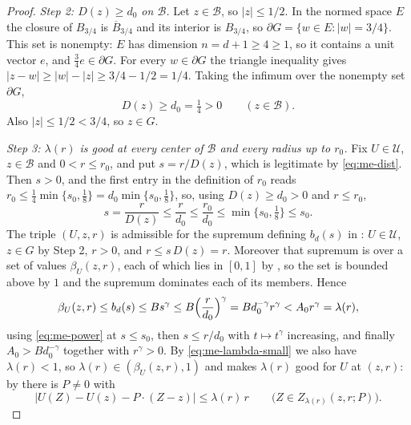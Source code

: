 \begin{proof}
\emph{Step 2: $D(z)\ge d_0$ on $\mathcal B$.}
Let $z\in\mathcal B$, so $|z|\le1/2$. In the normed space $E$ the closure of
$B_{3/4}$ is $\overline B_{3/4}$ and its interior is $B_{3/4}$, so
$\partial G=\{w\in E:|w|=3/4\}$. This set is nonempty: $E$ has dimension
$n=d+1\ge4\ge1$, so it contains a unit vector $e$, and $\tfrac34e\in\partial G$.
For every $w\in\partial G$ the triangle inequality gives
$|z-w|\ge|w|-|z|\ge3/4-1/2=1/4$. Taking the infimum over the nonempty set
$\partial G$,
\begin{equation}\label{eq:me-dist}
  D(z)\ge d_0=\tfrac14>0\qquad(z\in\mathcal B).
\end{equation}
Also $|z|\le1/2<3/4$, so $z\in G$.

\emph{Step 3: $\lambda(r)$ is good at every center of $\mathcal B$ and every
radius up to $r_0$.}
Fix $U\in\mathcal U$, $z\in\mathcal B$ and $0<r\le r_0$, and put
$s=r/D(z)$, which is legitimate by \eqref{eq:me-dist}. Then $s>0$, and the first entry in the definition of $r_0$ reads
$r_0\le\tfrac14\min\{s_0,\tfrac18\}=d_0\min\{s_0,\tfrac18\}$, so, using
$D(z)\ge d_0>0$ and $r\le r_0$,
\[
  s=\frac{r}{D(z)}\le\frac{r}{d_0}\le\frac{r_0}{d_0}
   \le\min\{s_0,\tfrac18\}\le s_0 .
\]
The triple $(U,z,r)$ is admissible for the
supremum defining $b_d(s)$ in : $U\in\mathcal U$,
$z\in G$ by Step 2, $r>0$, and $r\le s\,D(z)=r$. Moreover that supremum is over
a set of values $\beta_U(z,r)$, each of which lies in $[0,1]$ by
, so the set is bounded above by $1$ and the supremum
dominates each of its members. Hence
\[
  \beta_U(z,r)\le b_d(s)\le Bs^\gamma\le B\Bigl(\frac{r}{d_0}\Bigr)^\gamma
   =Bd_0^{-\gamma}r^\gamma<A_0r^\gamma=\lambda(r),
\]
using \eqref{eq:me-power} at $s\le s_0$, then $s\le r/d_0$ with
$t\mapsto t^\gamma$ increasing, and finally $A_0>Bd_0^{-\gamma}$ together with
$r^\gamma>0$. By \eqref{eq:me-lambda-small} we also have $\lambda(r)<1$, so
$\lambda(r)\in(\beta_U(z,r),1)$ and  makes $\lambda(r)$
good for $U$ at $(z,r)$: by  there is $P\ne0$ with
\begin{equation}\label{eq:me-fit}
  |U(Z)-U(z)-P\cdot(Z-z)|\le\lambda(r)\,r
  \qquad\bigl(Z\in Z_{\lambda(r)}(z,r;P)\bigr).
\end{equation}


\end{proof}
